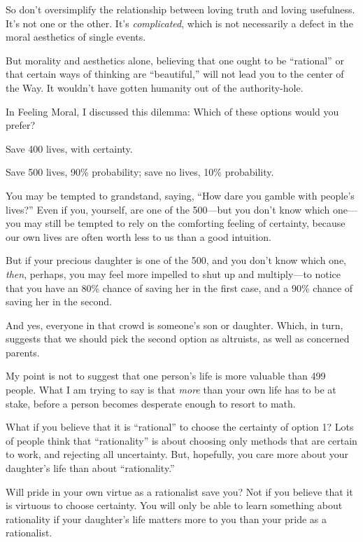 {
 So don't oversimplify the relationship between
loving truth and loving usefulness. It's not one or the
other. It's \textit{complicated}, which is not
necessarily a defect in the moral aesthetics of single events.}

{
 But morality and aesthetics alone, believing that one ought to be
``rational'' or that certain ways of
thinking are ``beautiful,'' will not
lead you to the center of the Way. It wouldn't have
gotten humanity out of the authority-hole.}

{
 In Feeling Moral, I discussed this dilemma: Which of these options
would you prefer?}

{
 Save 400 lives, with certainty.}

{
 Save 500 lives, 90\% probability; save no lives, 10\%
probability.}

{
 You may be tempted to grandstand, saying, ``How
dare you gamble with people's
lives?'' Even if you, yourself, are one of the
500---but you don't know which one---you may still be
tempted to rely on the comforting feeling of certainty, because our own
lives are often worth less to us than a good intuition.}

{
 But if your precious daughter is one of the 500, and you
don't know which one, \textit{then}, perhaps, you may
feel more impelled to shut up and multiply---to notice that you have an
80\% chance of saving her in the first case, and a 90\% chance of
saving her in the second.}

{
 And yes, everyone in that crowd is someone's son
or daughter. Which, in turn, suggests that we should pick the second
option as altruists, as well as concerned parents.}

{
 My point is not to suggest that one person's life
is more valuable than 499 people. What I am trying to say is that
\textit{more} than your own life has to be at stake, before a person
becomes desperate enough to resort to math.}

{
 What if you believe that it is
``rational'' to choose the certainty
of option 1? Lots of people think that
``rationality'' is about choosing
only methods that are certain to work, and rejecting all uncertainty.
But, hopefully, you care more about your daughter's
life than about ``rationality.''}

{
 Will pride in your own virtue as a rationalist save you? Not if
you believe that it is virtuous to choose certainty. You will only be
able to learn something about rationality if your
daughter's life matters more to you than your pride as
a rationalist.}

